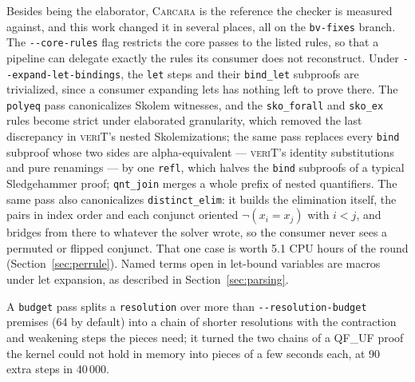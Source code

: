 \documentclass[runningheads]{llncs}
\newcommand{\carcara}{\textsc{Carcara}\xspace}
\newcommand{\verit}{\textsc{veriT}\xspace}
\newcommand{\rulename}[1]{\texttt{#1}}
\begin{document}
Besides being the elaborator, \carcara is the reference the checker is
measured against, and this work changed it in several places, all on the
\texttt{bv-fixes} branch. The \texttt{-{}-core-rules} flag restricts the core
passes to the listed rules, so that a pipeline can delegate exactly the rules
its consumer does not reconstruct. Under \texttt{-{}-expand-let-bindings}, the
\rulename{let} steps and their \rulename{bind\_let} subproofs are trivialized,
since a consumer expanding lets has nothing left to prove there. The
\texttt{polyeq} pass canonicalizes Skolem witnesses, and the
\rulename{sko\_forall} and \rulename{sko\_ex} rules become strict under
elaborated granularity, which removed the last discrepancy in \verit's nested
Skolemizations; the same pass replaces every \rulename{bind} subproof whose
two sides are alpha-equivalent --- \verit's identity substitutions and pure
renamings --- by one \rulename{refl}, which halves the \rulename{bind}
subproofs of a typical Sledgehammer proof; \rulename{qnt\_join} merges a
whole prefix of nested quantifiers. The same pass also canonicalizes
\rulename{distinct\_elim}: it builds the elimination itself, the pairs in
index order and each conjunct oriented $\neg(x_i = x_j)$ with $i < j$, and
bridges from there to whatever the solver wrote, so the consumer never sees a
permuted or flipped conjunct. That one case is worth 5.1 CPU hours of the
round (Section~\ref{sec:perrule}). Named terms open in let-bound variables
are macros under let expansion, as described in Section~\ref{sec:parsing}.

A \texttt{budget} pass splits a \rulename{resolution} over more than
\texttt{-{}-resolution-budget} premises (64 by default) into a chain of
shorter resolutions with the contraction and weakening steps the pieces need;
it turned the two chains of a QF\_UF proof the kernel could not hold in memory
into pieces of a few seconds each, at 90 extra steps in 40\,000.
\end{document}
